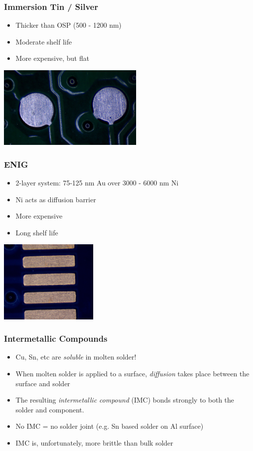 \documentclass{beamer}
\begin{document}
\begin{frame}
\frametitle{Immersion Tin / Silver}
\begin{itemize}
\item Thicker than OSP (500 - 1200 nm)
\item Moderate shelf life
\item More expensive, but flat
\end{itemize}
\begin{center}
\includegraphics[height=4cm,keepaspectratio]{immersion-silver.jpg}
\end{center}
\end{frame}

\begin{frame}
\frametitle{ENIG}
\begin{itemize}
\item 2-layer system: 75-125 nm Au over 3000 - 6000 nm Ni
\item Ni acts as diffusion barrier
\item More expensive
\item Long shelf life
\end{itemize}
\begin{center}
\includegraphics[height=4cm,keepaspectratio]{enig.jpg}
\end{center}
\end{frame}

\begin{frame}
\frametitle{Intermetallic Compounds}
\begin{itemize}
\item Cu, Sn, etc are \emph{soluble} in molten solder!
\item When molten solder is applied to a surface, \emph{diffusion} takes place between the surface and solder
\item The resulting \emph{intermetallic compound} (IMC) bonds strongly to both the solder and component.
\item No IMC = no solder joint (e.g. Sn based solder on Al surface)
\item IMC is, unfortunately, more brittle than bulk solder
\end{itemize}
\end{frame}
\end{document}
